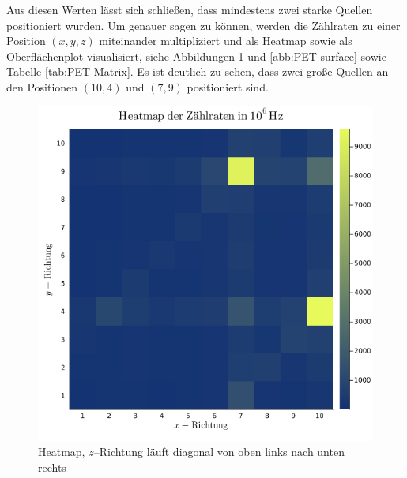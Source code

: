 \documentclass[12pt,a4paper]{scrartcl}
\numberwithin{equation}{section} %
\begin{document}
Aus diesen Werten lässt sich schließen, dass mindestens zwei starke Quellen positioniert wurden. Um genauer sagen zu können, werden die Zählraten zu einer Position $(x,y,z)$ miteinander multipliziert und als Heatmap sowie als Oberflächenplot visualisiert, siehe Abbildungen \ref{abb:PET heatmap} und \ref{abb:PET surface} sowie Tabelle \ref{tab:PET Matrix}. Es ist deutlich zu sehen, dass zwei große Quellen an den Positionen $(10,4)$ und $(7,9)$ positioniert sind.

\begin{figure}[h!]
	\centering
	\begin{minipage}[t]{0.7\textwidth}
		\includegraphics[width=\textwidth]{../media/B3.4/heatmap.png}
		\caption{Heatmap, $z$--Richtung läuft diagonal von oben links nach unten rechts}
		\label{abb:PET heatmap}
	\end{minipage}


\end{figure}
\end{document}

